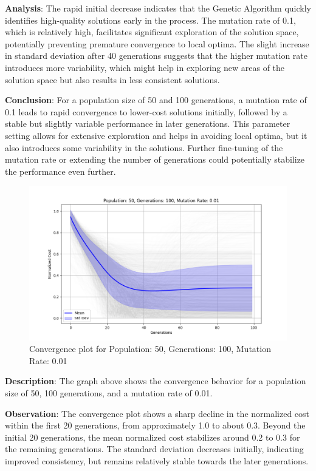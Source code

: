 \documentclass[
]{article}
\begin{document}
    \textbf{Analysis}: The rapid initial decrease indicates that the Genetic Algorithm quickly identifies high-quality solutions early in the process. The mutation rate of 0.1, which is relatively high, facilitates significant exploration of the solution space, potentially preventing premature convergence to local optima. The slight increase in standard deviation after 40 generations suggests that the higher mutation rate introduces more variability, which might help in exploring new areas of the solution space but also results in less consistent solutions.

    \textbf{Conclusion}: For a population size of 50 and 100 generations, a mutation rate of 0.1 leads to rapid convergence to lower-cost solutions initially, followed by a stable but slightly variable performance in later generations. This parameter setting allows for extensive exploration and helps in avoiding local optima, but it also introduces some variability in the solutions. Further fine-tuning of the mutation rate or extending the number of generations could potentially stabilize the performance even further.

    \begin{figure}[H]
        \centering
        \includegraphics[width=\textwidth]{genetic_algorithm/Population_50_Generations_100_MutationRate_0.01}
        \caption{Convergence plot for Population: 50, Generations: 100, Mutation Rate: 0.01}
        \label{fig:ga_50_100_01}
    \end{figure}

    \textbf{Description}: The graph above shows the convergence behavior for a population size of 50, 100 generations, and a mutation rate of 0.01.

    \textbf{Observation}: The convergence plot shows a sharp decline in the normalized cost within the first 20 generations, from approximately 1.0 to about 0.3. Beyond the initial 20 generations, the mean normalized cost stabilizes around 0.2 to 0.3 for the remaining generations. The standard deviation decreases initially, indicating improved consistency, but remains relatively stable towards the later generations.
\end{document}
